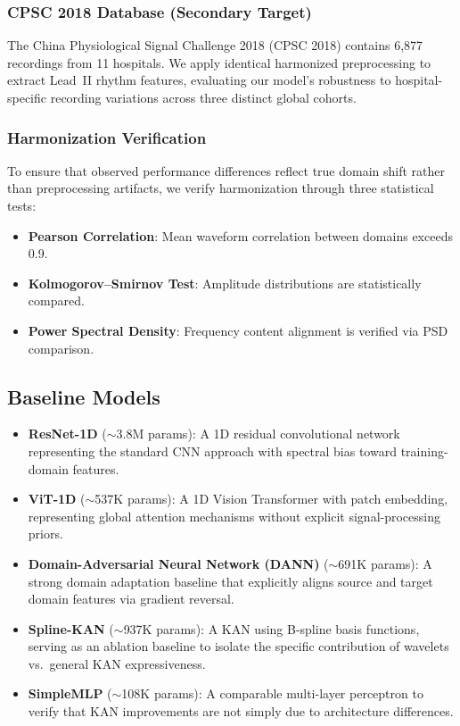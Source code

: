 \documentclass[journal,twoside,web]{ieeecolor}
\begin{document}
\subsubsection{CPSC 2018 Database (Secondary Target)}
The China Physiological Signal Challenge 2018 (CPSC 2018) contains 6,877 recordings from 11 hospitals. We apply identical harmonized preprocessing to extract Lead~II rhythm features, evaluating our model's robustness to hospital-specific recording variations across three distinct global cohorts.

\subsubsection{Harmonization Verification}
To ensure that observed performance differences reflect true domain shift rather than preprocessing artifacts, we verify harmonization through three statistical tests:
\begin{itemize}
    \item \textbf{Pearson Correlation}: Mean waveform correlation between domains exceeds 0.9.
    \item \textbf{Kolmogorov--Smirnov Test}: Amplitude distributions are statistically compared.
    \item \textbf{Power Spectral Density}: Frequency content alignment is verified via PSD comparison.
\end{itemize}

\subsection{Baseline Models}

\begin{itemize}
    \item \textbf{ResNet-1D} ($\sim$3.8M params): A 1D residual convolutional network representing the standard CNN approach with spectral bias toward training-domain features.
    \item \textbf{ViT-1D} ($\sim$537K params): A 1D Vision Transformer with patch embedding, representing global attention mechanisms without explicit signal-processing priors.
    \item \textbf{Domain-Adversarial Neural Network (DANN)} ($\sim$691K params): A strong domain adaptation baseline that explicitly aligns source and target domain features via gradient reversal.
    \item \textbf{Spline-KAN} ($\sim$937K params): A KAN using B-spline basis functions, serving as an ablation baseline to isolate the specific contribution of wavelets vs.\ general KAN expressiveness.
    \item \textbf{SimpleMLP} ($\sim$108K params): A comparable multi-layer perceptron to verify that KAN improvements are not simply due to architecture differences.
\end{itemize}
\end{document}
